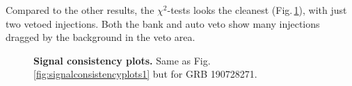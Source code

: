 \documentclass[binding=0.6cm, LaM]{sapthesis}
\begin{document}
	Compared to the other results, the $\chi^2$-tests looks the cleanest (Fig.\,\ref{fig:scplots2_final}), 
	with just two vetoed injections.
        Both the bank and auto veto show many injections dragged by the background in the veto area.
        \begin{figure}[!t]
          \noindent
          \label{scplots2_final}
          \centering
          \caption{\textbf{Signal consistency plots.} Same as Fig.\,\ref{fig:signalconsistencyplots1} but for GRB 190728271.}
          \label{fig:scplots2_final}
        \end{figure}        
\end{document}
